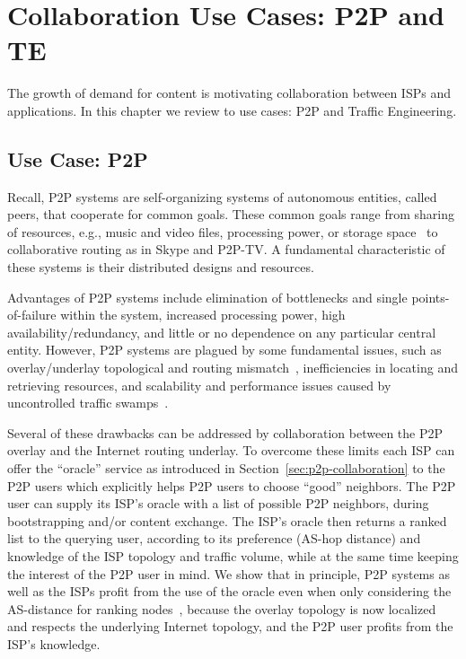 \section{Collaboration Use Cases: P2P and TE}\label{sec:Oracle-and-TE}

The growth of demand for content is motivating collaboration between ISPs and
applications. In this chapter we review to use cases: P2P and Traffic Engineering.

\subsection{Use Case: P2P}\label{sec:oracle} 

Recall, P2P systems are self-organizing systems of autonomous entities, called
peers, that cooperate for common goals. These common goals range from sharing
of resources, e.g., music and video files, processing power, or storage
space~\cite{P2P-LNCS-05} to collaborative routing as in Skype and P2P-TV.  A
fundamental characteristic of these systems is their distributed designs and
resources.

Advantages of P2P systems include elimination of bottlenecks and single
points-of-failure within the system, increased processing power, high
availability/redundancy, and little or no dependence on any particular central
entity.  However, P2P systems are plagued by some fundamental issues, such as
overlay/underlay topological and routing mismatch~\cite{sa-oidronl-06},
inefficiencies in locating and retrieving resources, and scalability and
performance issues caused by uncontrolled traffic swamps~\cite{P2P-LNCS-05}.

Several of these drawbacks can be addressed by collaboration between the P2P
overlay and the Internet routing underlay. To overcome these limits each ISP
can offer the ``oracle'' service as introduced in
Section~\ref{sec:p2p-collaboration} to the P2P users which explicitly helps P2P
users to choose ``good'' neighbors.  The P2P user can supply its ISP's oracle
with a list of possible P2P neighbors, during bootstrapping and/or content
exchange.  The ISP's oracle then returns a ranked list to the querying user,
according to its preference (\eg AS-hop distance) and knowledge of the ISP
topology and traffic volume, while at the same time keeping the interest of the
P2P user in mind.  We  show that in principle, P2P systems as well as the ISPs
profit from the use of the oracle even when only considering the AS-distance
for ranking nodes~\cite{afs-cispp2pcip-ccr07}, because the overlay topology is now
localized and respects the underlying Internet topology, and the P2P user
profits from the ISP's knowledge.

